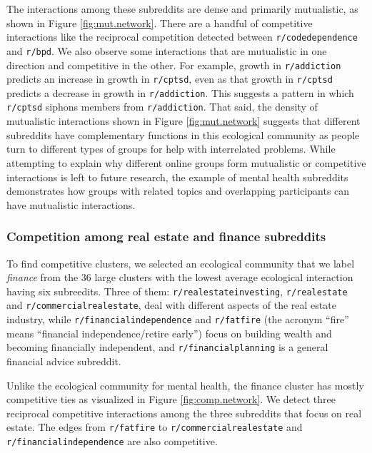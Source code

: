 \documentclass[letterpaper]{article}\usepackage[]{graphicx}\usepackage[]{color}
\def\Slash{\slash\hspace{0pt}}
\begin{document}
The interactions among these subreddits are dense and primarily mutualistic, as shown in Figure \ref{fig:mut.network}. There are a handful of competitive interactions like the reciprocal competition detected between \texttt{r\Slash codedependence} and \texttt{r\Slash bpd}. We also observe some interactions that are mutualistic in one direction and competitive in the other. For example, growth in \texttt{r\Slash addiction} predicts an increase in growth in \texttt{r\Slash cptsd}, even as that growth in \texttt{r\Slash cptsd} predicts a decrease in growth in \texttt{r\Slash addiction}. This suggests a pattern in which \texttt{r\Slash cptsd} siphons members from \texttt{r\Slash addiction}. That said, the density of mutualistic interactions shown in Figure \ref{fig:mut.network} suggests that different subreddits have complementary functions in this ecological community as people turn to different types of groups for help with interrelated problems.  While attempting to explain why different online groups form mutualistic or competitive interactions is left to future research, the example of mental health subreddits demonstrates how groups with related topics and overlapping participants can have mutualistic interactions.

\subsubsection{Competition among real estate and finance subreddits}

To find competitive clusters, we selected an ecological community that we label \textit{finance} from the 36 large clusters with the lowest average ecological interaction having six subreedits. Three of them: \texttt{r\Slash realestateinvesting}, \texttt{r\Slash realestate} and \texttt{r\Slash commercialrealestate}, deal with different aspects of the real estate industry, while \texttt{r\Slash financialindependence} and \texttt{r\Slash fatfire} (the acronym ``fire'' means ``financial independence/retire early'') focus on building wealth and becoming financially independent, and \texttt{r\Slash financialplanning} is a general financial advice subreddit.

Unlike the ecological community for mental health, the finance cluster has mostly competitive ties as visualized in Figure \ref{fig:comp.network}. We detect three reciprocal competitive interactions among the three subreddits that focus on real estate. The edges from \texttt{r\Slash fatfire} to \texttt{r\Slash commercialrealestate} and \texttt{r\Slash financialindependence} are also competitive.   
\end{document}
